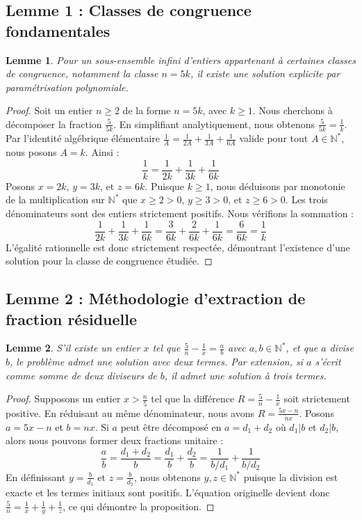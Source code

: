 \documentclass[12pt,a4paper]{article}
\newtheorem{lemma}{Lemme}
\begin{document}
\subsection{Lemme 1 : Classes de congruence fondamentales}

\begin{lemma}
Pour un sous-ensemble infini d'entiers appartenant à certaines classes de congruence, notamment la classe $n = 5k$, il existe une solution explicite par paramétrisation polynomiale.
\end{lemma}

\begin{proof}
Soit un entier $n \ge 2$ de la forme $n = 5k$, avec $k \ge 1$.
Nous cherchons à décomposer la fraction $\frac{5}{5k}$.
En simplifiant analytiquement, nous obtenons $\frac{5}{5k} = \frac{1}{k}$.
Par l'identité algébrique élémentaire $\frac{1}{A} = \frac{1}{2A} + \frac{1}{3A} + \frac{1}{6A}$ valide pour tout $A \in \mathbb{N}^{*}$, nous posons $A = k$.
Ainsi :
$$ \frac{1}{k} = \frac{1}{2k} + \frac{1}{3k} + \frac{1}{6k} $$
Posons $x = 2k$, $y = 3k$, et $z = 6k$.
Puisque $k \ge 1$, nous déduisons par monotonie de la multiplication sur $\mathbb{N}^{*}$ que $x \ge 2 > 0$, $y \ge 3 > 0$, et $z \ge 6 > 0$.
Les trois dénominateurs sont des entiers strictement positifs.
Nous vérifions la sommation :
$$ \frac{1}{2k} + \frac{1}{3k} + \frac{1}{6k} = \frac{3}{6k} + \frac{2}{6k} + \frac{1}{6k} = \frac{6}{6k} = \frac{1}{k} $$
L'égalité rationnelle est donc strictement respectée, démontrant l'existence d'une solution pour la classe de congruence étudiée.
\end{proof}

\subsection{Lemme 2 : Méthodologie d'extraction de fraction résiduelle}

\begin{lemma}
S'il existe un entier $x$ tel que $\frac{5}{n} - \frac{1}{x} = \frac{a}{b}$ avec $a, b \in \mathbb{N}^{*}$, et que $a$ divise $b$, le problème admet une solution avec deux termes. Par extension, si $a$ s'écrit comme somme de deux diviseurs de $b$, il admet une solution à trois termes.
\end{lemma}

\begin{proof}
Supposons un entier $x > \frac{n}{5}$ tel que la différence $R = \frac{5}{n} - \frac{1}{x}$ soit strictement positive.
En réduisant au même dénominateur, nous avons $R = \frac{5x - n}{nx}$.
Posons $a = 5x - n$ et $b = nx$.
Si $a$ peut être décomposé en $a = d_1 + d_2$ où $d_1 | b$ et $d_2 | b$, alors nous pouvons former deux fractions unitaire :
$$ \frac{a}{b} = \frac{d_1 + d_2}{b} = \frac{d_1}{b} + \frac{d_2}{b} = \frac{1}{b/d_1} + \frac{1}{b/d_2} $$
En définissant $y = \frac{b}{d_1}$ et $z = \frac{b}{d_2}$, nous obtenons $y, z \in \mathbb{N}^{*}$ puisque la division est exacte et les termes initiaux sont positifs.
L'équation originelle devient donc $\frac{5}{n} = \frac{1}{x} + \frac{1}{y} + \frac{1}{z}$, ce qui démontre la proposition.
\end{proof}
\end{document}

